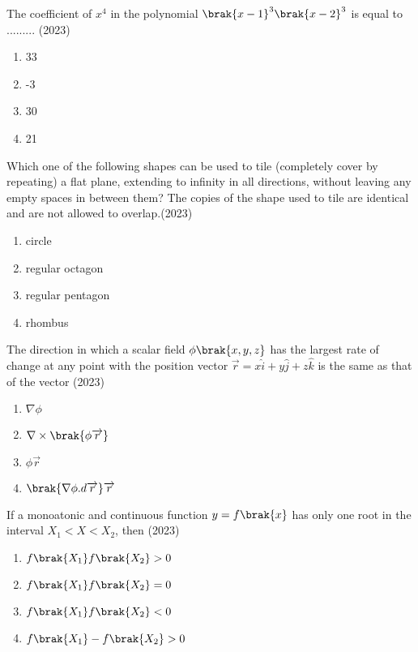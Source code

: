     \item[9.] The coefficient of $x^4$ in the polynomial $\brak{x-1}^3\brak{x-2}^3$ is equal to ......... \hfill (2023)
    \begin{enumerate}[label = (\Alph*)]
        \item 33
        \item -3
        \item 30
        \item 21
    \end{enumerate}
    \item[10.] Which one of the following shapes can be used to tile (completely cover by
    repeating) a flat plane, extending to infinity in all directions, without leaving any
    empty spaces in between them? The copies of the shape used to tile are identical
    and are not allowed to overlap.\hfill (2023)
    \begin{enumerate}[label = (\Alph*)]
        \item circle 
        \item regular octagon
        \item regular pentagon
        \item rhombus
    \end{enumerate}
    \item[11.] The direction in which a scalar field $\phi\brak{x, y, z}$ has the largest rate of change at any point with the position vector $\overrightarrow{r} = x\hat{i} + y\hat{j} +z\hat{k}$ is the same as that of the vector \hfill (2023)
    \begin{enumerate}[label = (\Alph*)]
        \item $\nabla \phi$
        \item $\nabla\times\brak{\phi\overrightarrow{r}}$
        \item $\phi\overrightarrow{r}$
        \item $\brak{\nabla\phi.d\overrightarrow{r}}\overrightarrow{r}$
    \end{enumerate}
    \item[12.] If a monoatonic and continuous function $y = f\brak{x}$ has only one root in the interval $X_1<X<X_2$, then \hfill (2023)
    \begin{enumerate}[label = (\Alph*)]
        \item $f\brak{X_1}f\brak{X_2}>0$
        \item $f\brak{X_1}f\brak{X_2}=0$
        \item $f\brak{X_1}f\brak{X_2}<0$
        \item $f\brak{X_1}-f\brak{X_2}>0$
    \end{enumerate}
